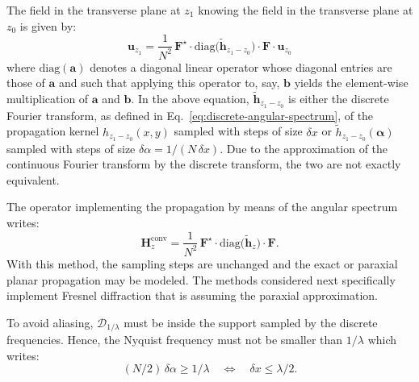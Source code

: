 \documentclass[a4paper]{article}
\newcommand{\V}[1]{\boldsymbol{#1}}
\newcommand*{\FT}[1]{\widetilde{#1}}
\begin{document}
The field in the transverse plane at $z_{1}$ knowing the field in the
transverse plane at $z_{0}$ is given by:
\begin{equation}
  \label{eq:7}
  \boldsymbol{u}_{z_{1}} = \frac{1}{N^{2}}\,\mathbf{F}^{\star}·
  \mathrm{diag}\bigl(\FT{\boldsymbol{h}}_{z_{1} - z_{0}}\bigr)·
  \mathbf{F}·\boldsymbol{u}_{z_{0}}
\end{equation}
where $\mathrm{diag}(\boldsymbol{a})$ denotes a diagonal linear operator whose
diagonal entries are those of $\boldsymbol{a}$ and such that applying this
operator to, say, $\boldsymbol{b}$ yields the element-wise multiplication of
$\boldsymbol{a}$ and $\boldsymbol{b}$. In the above equation,
$\FT{\boldsymbol{h}}_{z_{1} - z_{0}}$ is either the discrete Fourier transform,
as defined in Eq.~\eqref{eq:discrete-angular-spectrum}, of the propagation
kernel $h_{z_{1} - z_{0}}(x,y)$ sampled with steps of size $δx$ or
$\FT{h}_{z_{1} - z_{0}}(\V{α})$ sampled with steps of size $δα = 1/(N\,δx)$.
Due to the approximation of the continuous Fourier transform by the discrete
transform, the two are not exactly equivalent.

The operator implementing the propagation by means of the angular spectrum
writes:
\begin{equation}
  \label{eq:angular-spectrum-propagator}
  \mathbf{H}_{z}^{\text{conv}} = \frac{1}{N^{2}}\,\mathbf{F}^{\star}·
  \mathrm{diag}\bigl(\FT{\boldsymbol{h}}_{z}\bigr)·
  \mathbf{F}.
\end{equation}
With this method, the sampling steps are unchanged and the exact or paraxial
planar propagation may be modeled. The methods considered next specifically
implement Fresnel diffraction that is assuming the paraxial approximation.

To avoid aliasing, $\mathcal{D}_{1/λ}$ must be inside the support sampled by
the discrete frequencies. Hence, the Nyquist frequency must not be smaller than
$1/λ$ which writes:
\begin{equation}
  \label{eq:no-aliasing-condition}
  (N/2)\,δα ≥ 1/λ
  \quad\Longleftrightarrow\quad
  δx ≤ λ/2.
\end{equation}
\end{document}
